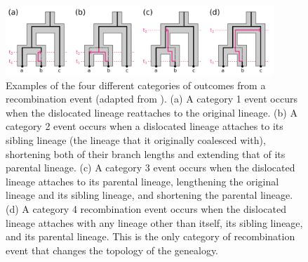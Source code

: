 \documentclass[11pt]{article}
\begin{document}


\begin{figure}
	\centering
	\includegraphics[width=0.9\textwidth]{figures/Fig2-new-recomb-types.pdf}
	\caption{
	Examples of the four different categories of outcomes from a 
	recombination event (adapted from \citep{deng_distribution_2021}). 
	(a) A category 1 event occurs when the dislocated lineage reattaches to the 
	original lineage. 
	(b) A category 2 event occurs when a dislocated lineage attaches to its 
	sibling lineage (the lineage that it originally coalesced with), shortening 
	both of their branch lengths and extending that of its parental lineage. 
	(c) A category 3 event occurs when the dislocated lineage attaches to its 
	parental lineage, lengthening the original lineage and its sibling lineage,
	and shortening the parental lineage.
	(d) A category 4 recombination event occurs when the dislocated lineage
	attaches with any lineage other than itself, its sibling lineage, and its
	parental lineage. This is the only category of recombination event that
	changes the topology of the genealogy.
}
\label{fig:fig2}
\end{figure}
\end{document}
